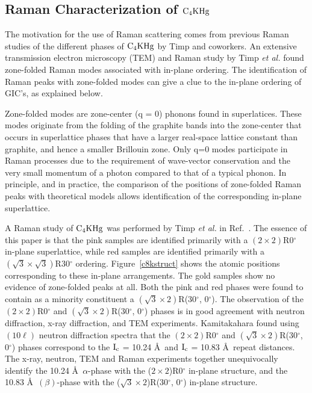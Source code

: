 \subsection{Raman Characterization of $\rm C_4KHg$}
\label{ramdata}

        The motivation for the use of Raman  scattering comes from previous
Raman   studies  of  the  different phases  of $\rm  C_4KHg$   by  Timp and
coworkers.\cite{N128} An extensive  transmission electron  microscopy (TEM)
and Raman study   by Timp {\em   et al.\/}  found  zone-folded Raman  modes
associated with in-plane ordering.  The identification  of Raman peaks with
zone-folded modes  can give a clue  to the in-plane  ordering of  GIC's, as
explained below.

        Zone-folded  modes  are zone-center   (q  =  0) phonons   found  in
superlatices.   These  modes originate from the folding   of the
graphite bands into the zone-center that occurs in superlattice phases that
have  a  larger real-space  lattice constant  than  graphite,  and  hence a
smaller Brillouin zone.  Only q=0 modes  participate in Raman processes due
to the requirement of wave-vector conservation and  the very small momentum
of a photon compared to that of a typical phonon.   In principle,\cite{F120}
and in practice,\cite{N128} the comparison of the  positions of zone-folded
Raman  peaks    with theoretical models   allows  identification   of   the
corresponding in-plane superlattice.

        A Raman study of $\rm C_4KHg$ was performed by  Timp {\em et al.\/}
in Ref.~\cite{N128}.  The essence  of this paper  is that the  pink samples
are identified primarily with a $(2
\times   2)$R0$^{\circ}$  in-plane  superlattice,  while  red  samples  are
identified  primarily with   a  $(\sqrt{3}  \times  \sqrt{3})$R30$^{\circ}$
ordering.\cite{N128}  Figure~\ref{c8kstruct}  shows  the  atomic  positions
corresponding to these  in-plane  arrangements.  The  gold samples  show no
evidence  of  zone-folded peaks at   all.\cite{N128} Both the  pink and red
phases were found to contain as a minority constituent a  $(\sqrt{3} \times
2)$R(30$^{\circ}$,  0$^{\circ}$).    The   observation of the   $(2  \times
2)$R0$^{\circ}$  and  $(\sqrt{3}  \times   2)$R(30$^{\circ}$,  0$^{\circ}$)
phases is in good  agreement with neutron diffraction,\cite{kamitakahara84}
x-ray   diffraction,\cite{elmakrini80}   and  TEM\cite{K167}   experiments.
Kamitakahara\cite{kamitakahara84}   found     using    $(10\ell)$   neutron
diffraction spectra  that   the $(2 \times 2)$R0$^{\circ}$  and  $(\sqrt{3}
\times 2)$R(30$^{\circ}$, 0$^{\circ}$) phases correspond to the $\rm I_c$ =
10.24  \AA\ and $\rm  I_c$   = 10.83 \AA\  repeat  distances.   The  x-ray,
neutron, TEM and  Raman  experiments  together unequivocally identify   the
10.24  \AA\ $\alpha$-phase  with  the ($2  \times 2$)R0$^{\circ}$  in-plane
structure, and the 10.83 \AA\ $(\beta)$-phase with the ($\sqrt{3}
\times 2$)R(30$^{\circ}$, 0$^{\circ}$) in-plane structure.

